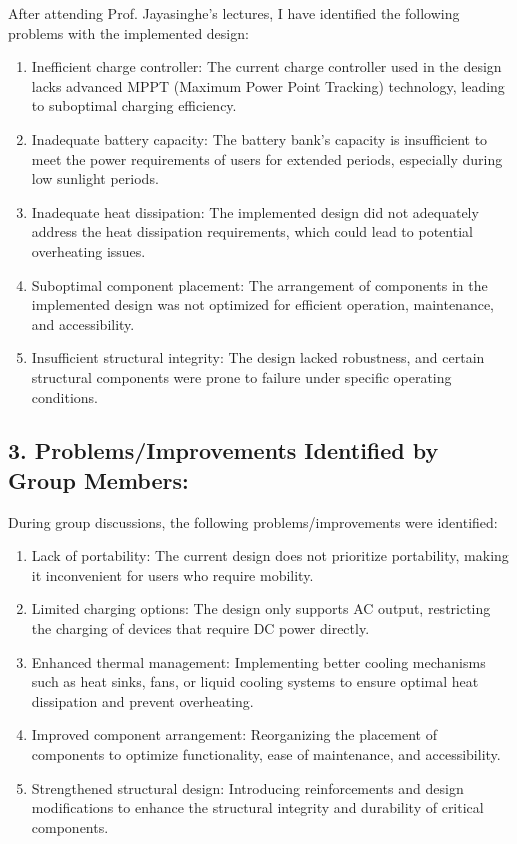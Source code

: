 \documentclass[twocolumn]{article}
\begin{document}
\noindent After attending Prof. Jayasinghe's lectures, I have identified the following problems with the implemented design:
\indent{5pt}
\begin{enumerate}

    \item Inefficient charge controller: The current charge controller used in the design lacks advanced MPPT (Maximum Power Point Tracking) technology, leading to suboptimal charging efficiency.
    \item Inadequate battery capacity: The battery bank's capacity is insufficient to meet the power requirements of users for extended periods, especially during low sunlight periods.
    \item Inadequate heat dissipation: The implemented design did not adequately address the heat dissipation requirements, which could lead to potential overheating issues.

    \item Suboptimal component placement: The arrangement of components in the implemented design was not optimized for efficient operation, maintenance, and accessibility.

    \item Insufficient structural integrity: The design lacked robustness, and certain structural components were prone to failure under specific operating conditions.
    
\end{enumerate}

\subsection*{3. Problems/Improvements Identified by Group Members:}

\noindent During group discussions, the following problems/improvements were identified:

\begin{enumerate}

    \item Lack of portability: The current design does not prioritize portability, making it inconvenient for users who require mobility.
    \item Limited charging options: The design only supports AC output, restricting the charging of devices that require DC power directly.
    \item Enhanced thermal management: Implementing better cooling mechanisms such as heat sinks, fans, or liquid cooling systems to ensure optimal heat dissipation and prevent overheating.
    \item Improved component arrangement: Reorganizing the placement of components to optimize functionality, ease of maintenance, and accessibility.
    \item Strengthened structural design: Introducing reinforcements and design modifications to enhance the structural integrity and durability of critical components.
    
\end{enumerate}
\end{document}
